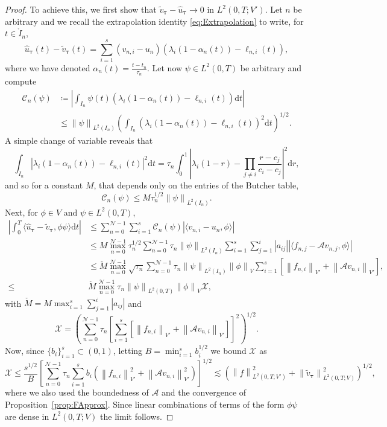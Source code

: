 \documentclass{amsart}
\newcommand{\nrm}[1]{\left\| #1 \right\|}
\newcommand{\bftau}{{\boldsymbol{\tau}}}
\newcommand{\mclA}{\mathcal{A}}
\newcommand{\mclX}{\mathcal{X}}
\newcommand{\mclC}{\mathcal{C}}
\newcommand{\mclN}{\mathcal{N}}
\theoremstyle{definition}
\newcommand{\diff}{\mathrm{d}}
\begin{document}
\begin{proof}
  To achieve this, we first show that $\tilde{v}_\bftau - \hat{u}_\bftau \to 0$ in $L^2(0,T;V')$. Let $n$ be arbitrary and we recall the extrapolation identity \eqref{eq:Extrapolation} to write, for $t \in \mathring{I}_n$,
  \[
    \hat{u}_\bftau(t) - \tilde{v}_\bftau(t) = \sum_{i=1}^s (v_{n,i} - u_n) \left( \lambda_i (1-\alpha_n(t)) - \ell_{n,i}(t) \right),
  \]
  where we have denoted $\alpha_n(t) = \tfrac{t -t_n}{\tau_n}$. Let now $\psi \in L^2(0,T)$ be arbitrary and compute
  \begin{align*}
    \mclC_n(\psi) &\coloneqq \left| \int_{I_n} \psi(t) \left( \lambda_i (1-\alpha_n(t)) - \ell_{n,i}(t) \right) \diff t \right| \\
      &\leq \nrm{ \psi }_{L^2(I_n)} \left( \int_{I_n} \left( \lambda_i (1-\alpha_n(t)) - \ell_{n,i}(t) \right)^2 \diff t \right)^{1/2}.
  \end{align*}
  A simple change of variable reveals that
  \[
    \int_{I_n} \left| \lambda_i (1-\alpha_n(t)) - \ell_{n,i}(t) \right|^2 \diff t = \tau_n \int_0^1 \left|\lambda_i (1-r) - \prod_{j\neq i} \frac{r-c_j}{c_i-c_j} \right|^2 \diff r,
  \]
  and so for a constant $M$, that depends only on the entries of the Butcher table,
  \[
    \mclC_n(\psi) \leq M \tau_n^{1/2} \nrm{ \psi }_{L^2(I_n)}.
  \]
  Next, for $\phi \in V$  and $\psi \in L^2(0,T)$,
  \begin{align*}
    \left|\int_0^T \langle \hat{u}_\bftau - \tilde{v}_\bftau, \phi \psi \rangle \diff t \right| &\leq \sum_{n=0}^{\mclN-1} \sum_{i=1}^s \mclC_n(\psi) | \langle v_{n,i} - u_n, \phi \rangle|
    \\
    &\leq M \max_{n=0}^{\mclN-1} \tau_n^{1/2} \sum_{n=0}^{\mclN-1} \tau_n \nrm{\psi}_{L^2(I_n)} \sum_{i=1}^s \sum_{j=1}^i |a_{ij}| \left| \langle f_{n,j} - \mclA v_{n,j}, \phi \rangle \right|
    \\
    &\leq
    \check{M} \max_{n=0}^{\mclN-1} \sqrt{\tau_n} \sum_{n=0}^{\mclN-1} \tau_n \nrm{\psi}_{L^2(I_n)} \nrm{\phi}_V \sum_{i=1}^s \left[ \nrm{f_{n,i} }_{V'} + \nrm{\mclA v_{n,i} }_{V'} \right],
    \\
    \leq &\check{M} \max_{n=0}^{\mclN-1} \tau_n \nrm{\psi}_{L^2(0,T)} \nrm{\phi}_V \mclX,
  \end{align*}
  with $\check{M} = M \max_{i=1}^s \sum_{j=1}^i |a_{ij}|$ and
  \[
    \mclX = \left( \sum_{n=0}^{\mclN-1} \tau_n \left[ \sum_{i=1}^s \left[ \nrm{f_{n,i} }_{V'} + \nrm{\mclA v_{n,i} }_{V'} \right] \right]^2 \right)^{1/2}.
  \]
  Now, since $\{b_i\}_{i=1}^s \subset (0,1)$, letting $B = \min_{i=1}^s b_i^{1/2}$ we bound $\mclX$ as
  \[
    \mclX \leq \frac{s^{1/2}} B \left[ \sum_{n=0}^{\mclN-1} \tau_n \sum_{i=1}^s b_i  \left( \nrm{f_{n,i} }_{V'}^2 + \nrm{\mclA v_{n,i} }_{V'}^2 \right)  \right]^{1/2}
    \lesssim \left( \nrm{f}_{L^2(0,T;V')}^2 + \nrm{ \tilde{v}_\bftau }_{L^2(0,T;V)}^2 \right)^{1/2},
  \]
  where we also used the boundedness of $\mclA$ and the convergence of Proposition~\ref{prop:FApprox}. Since linear combinations of terms of the form $\phi\psi$ are dense in $L^2(0,T;V)$ the limit follows.


\end{proof}
\end{document}
